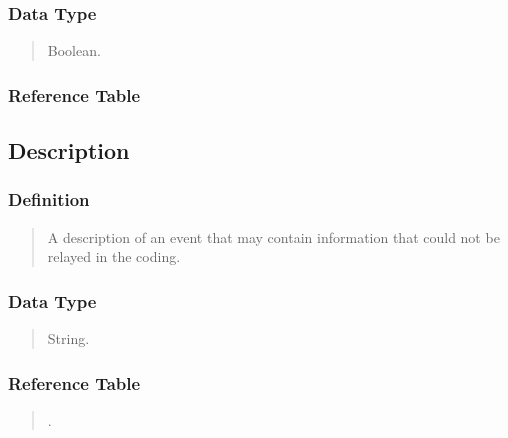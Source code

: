 \documentclass[letterpaper,10pt,english]{sphinxmanual}
\begin{document}
\subsubsection{Data Type}
\label{\detokenize{schema_tables:id83}}\begin{quote}

\sphinxAtStartPar
Boolean.
\end{quote}


\subsubsection{Reference Table}
\label{\detokenize{schema_tables:id84}}\begin{quote}

\sphinxAtStartPar
{\hyperref[\detokenize{schema_tables:overview-table}]{}}
\end{quote}


\subsection{Description}
\label{\detokenize{schema_tables:description}}

\subsubsection{Definition}
\label{\detokenize{schema_tables:id85}}\begin{quote}

\sphinxAtStartPar
A description of an event that may contain information that could not be relayed in the coding.
\end{quote}


\subsubsection{Data Type}
\label{\detokenize{schema_tables:id86}}\begin{quote}

\sphinxAtStartPar
String.
\end{quote}


\subsubsection{Reference Table}
\label{\detokenize{schema_tables:id87}}\begin{quote}

\sphinxAtStartPar
{\hyperref[\detokenize{schema_tables:overview-table}]{}}.
\end{quote}
\end{document}
